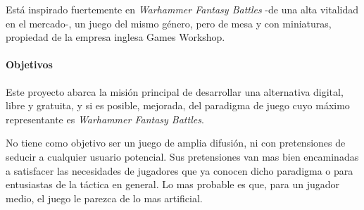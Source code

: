 Está inspirado fuertemente en \textit{Warhammer Fantasy Battles} -de una alta vitalidad en el mercado-, un juego del mismo género, pero de mesa y con miniaturas, propiedad de la empresa inglesa Games Workshop.

\paragraph{Objetivos}
Este proyecto abarca la misión principal de desarrollar una alternativa digital, libre y gratuita, y si es posible, mejorada, del paradigma de juego cuyo máximo representante es \textit{Warhammer Fantasy Battles}.

No tiene como objetivo ser un juego de amplia difusión, ni con pretensiones de seducir a cualquier usuario potencial. Sus pretensiones van mas bien encaminadas a satisfacer las necesidades de jugadores que ya conocen dicho paradigma o para entusiastas de la táctica en general. Lo mas probable es que, para un jugador medio, el juego le parezca de lo mas artificial.

